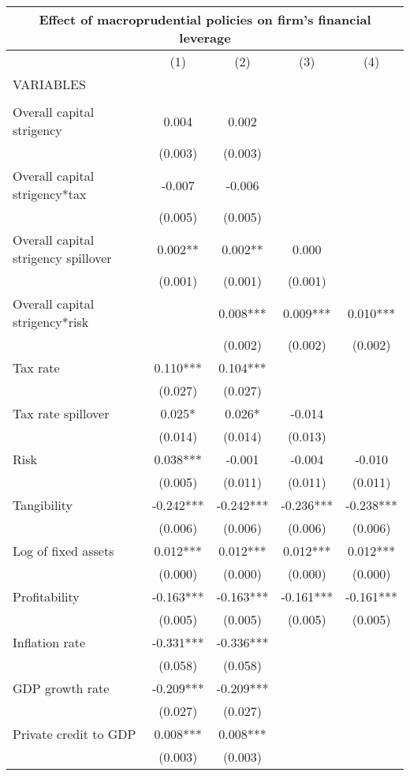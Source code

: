 \begin{tabular}{lcccc}
\multicolumn{5}{c}{Effect of macroprudential policies on firm's financial leverage} \\ \hline
 & (1) & (2) & (3) & (4) \\
VARIABLES &  &  &  &  \\ \hline
 &  &  &  &  \\
Overall capital strigency & 0.004 & 0.002 &  &  \\
 & (0.003) & (0.003) &  &  \\
Overall capital strigency*tax & -0.007 & -0.006 &  &  \\
 & (0.005) & (0.005) &  &  \\
Overall capital strigency spillover & 0.002** & 0.002** & 0.000 &  \\
 & (0.001) & (0.001) & (0.001) &  \\
Overall capital strigency*risk &  & 0.008*** & 0.009*** & 0.010*** \\
 &  & (0.002) & (0.002) & (0.002) \\
Tax rate & 0.110*** & 0.104*** &  &  \\
 & (0.027) & (0.027) &  &  \\
Tax rate spillover & 0.025* & 0.026* & -0.014 &  \\
 & (0.014) & (0.014) & (0.013) &  \\
Risk & 0.038*** & -0.001 & -0.004 & -0.010 \\
 & (0.005) & (0.011) & (0.011) & (0.011) \\
Tangibility & -0.242*** & -0.242*** & -0.236*** & -0.238*** \\
 & (0.006) & (0.006) & (0.006) & (0.006) \\
Log of fixed assets & 0.012*** & 0.012*** & 0.012*** & 0.012*** \\
 & (0.000) & (0.000) & (0.000) & (0.000) \\
Profitability & -0.163*** & -0.163*** & -0.161*** & -0.161*** \\
 & (0.005) & (0.005) & (0.005) & (0.005) \\
Inflation rate & -0.331*** & -0.336*** &  &  \\
 & (0.058) & (0.058) &  &  \\
GDP growth rate & -0.209*** & -0.209*** &  &  \\
 & (0.027) & (0.027) &  &  \\
Private credit to GDP & 0.008*** & 0.008*** &  &  \\
 & (0.003) & (0.003) &  &  \\

\end{tabular}
